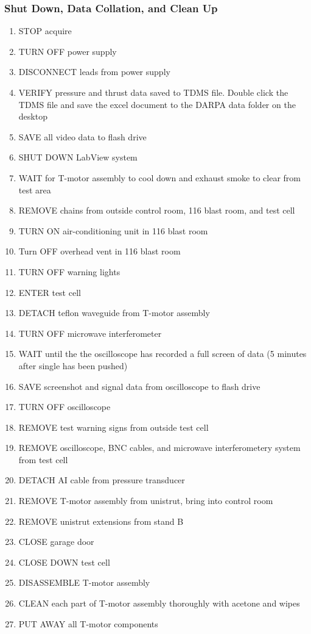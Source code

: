 \subsubsection*{Shut Down, Data Collation, and Clean Up}
\begin{enumerate}
    \item STOP acquire
    \item TURN OFF power supply
    \item DISCONNECT leads from power supply
    \item VERIFY pressure and thrust data saved to TDMS file. Double click the TDMS file and save the excel document to the DARPA data folder on the desktop
    \item SAVE all video data to flash drive
    \item SHUT DOWN LabView system
    \item WAIT for T-motor assembly to cool down and exhaust smoke to clear from test area
    \item REMOVE chains from outside control room, 116 blast room, and test cell
    \item TURN ON air-conditioning unit in 116 blast room
    \item Turn OFF overhead vent in 116 blast room
    \item TURN OFF warning lights
    \item ENTER test cell
    \item DETACH teflon waveguide from T-motor assembly
    \item TURN OFF microwave interferometer
    \item WAIT until the the oscilloscope has recorded a full screen of data (5 minutes after single has been pushed)
    \item SAVE screenshot and signal data from oscilloscope to flash drive
    \item TURN OFF oscilloscope
    \item REMOVE test warning signs from outside test cell
    \item REMOVE oscilloscope, BNC cables, and microwave interferometery system from test cell
    \item DETACH AI cable from pressure transducer
    \item REMOVE T-motor assembly from unistrut, bring into control room
    \item REMOVE unistrut extensions from stand B
    \item CLOSE garage door
    \item CLOSE DOWN test cell
    \item DISASSEMBLE T-motor assembly
    \item CLEAN each part of T-motor assembly thoroughly with acetone and wipes
    \item PUT AWAY all T-motor components    
\end{enumerate}


